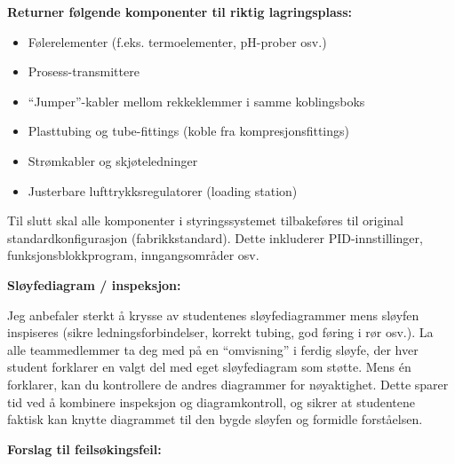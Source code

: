 \vskip 10pt

\indent
{\bf Returner følgende komponenter til riktig lagringsplass:}

\begin{itemize}
\item{} Følerelementer (f.eks. termoelementer, pH-prober osv.)
\item{} Prosess-transmittere
\item{} ``Jumper''-kabler mellom rekkeklemmer i samme koblingsboks
\item{} Plasttubing og tube-fittings (koble fra kompresjonsfittings)
\item{} Strømkabler og skjøteledninger
\item{} Justerbare lufttrykksregulatorer (loading station)
\end{itemize}

\vskip 10pt

Til slutt skal alle komponenter i styringssystemet tilbakeføres til original standardkonfigurasjon (fabrikkstandard). Dette inkluderer PID-innstillinger, funksjonsblokkprogram, inngangsområder osv.

















\noindent
{\bf Sløyfediagram / inspeksjon:}

Jeg anbefaler sterkt å krysse av studentenes sløyfediagrammer mens sløyfen inspiseres (sikre ledningsforbindelser, korrekt tubing, god føring i rør osv.). La alle teammedlemmer ta deg med på en ``omvisning'' i ferdig sløyfe, der hver student forklarer en valgt del med eget sløyfediagram som støtte. Mens én forklarer, kan du kontrollere de andres diagrammer for nøyaktighet. Dette sparer tid ved å kombinere inspeksjon og diagramkontroll, og sikrer at studentene faktisk kan knytte diagrammet til den bygde sløyfen og formidle forståelsen.

\vskip 10pt

\goodbreak

\noindent
{\bf Forslag til feilsøkingsfeil:}

